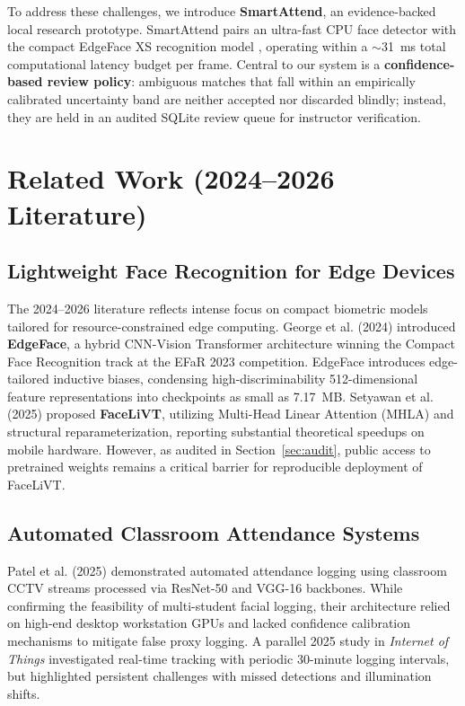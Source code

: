 \documentclass[conference]{IEEEtran}
\begin{document}
To address these challenges, we introduce \textbf{SmartAttend}, an evidence-backed local research prototype. SmartAttend pairs an ultra-fast CPU face detector with the compact EdgeFace XS recognition model \cite{george2024edgeface}, operating within a $\sim$31~ms total computational latency budget per frame. Central to our system is a \textbf{confidence-based review policy}: ambiguous matches that fall within an empirically calibrated uncertainty band are neither accepted nor discarded blindly; instead, they are held in an audited SQLite review queue for instructor verification.

\section{Related Work (2024--2026 Literature)}

\subsection{Lightweight Face Recognition for Edge Devices}
The 2024--2026 literature reflects intense focus on compact biometric models tailored for resource-constrained edge computing. George et al. (2024) \cite{george2024edgeface} introduced \textbf{EdgeFace}, a hybrid CNN-Vision Transformer architecture winning the Compact Face Recognition track at the EFaR 2023 competition. EdgeFace introduces edge-tailored inductive biases, condensing high-discriminability 512-dimensional feature representations into checkpoints as small as 7.17~MB. Setyawan et al. (2025) \cite{setyawan2025facelivt} proposed \textbf{FaceLiVT}, utilizing Multi-Head Linear Attention (MHLA) and structural reparameterization, reporting substantial theoretical speedups on mobile hardware. However, as audited in Section~\ref{sec:audit}, public access to pretrained weights remains a critical barrier for reproducible deployment of FaceLiVT.

\subsection{Automated Classroom Attendance Systems}
Patel et al. (2025) \cite{patel2025cctv} demonstrated automated attendance logging using classroom CCTV streams processed via ResNet-50 and VGG-16 backbones. While confirming the feasibility of multi-student facial logging, their architecture relied on high-end desktop workstation GPUs and lacked confidence calibration mechanisms to mitigate false proxy logging. A parallel 2025 study in \textit{Internet of Things} \cite{alqurishi2025iot} investigated real-time tracking with periodic 30-minute logging intervals, but highlighted persistent challenges with missed detections and illumination shifts.
\end{document}

